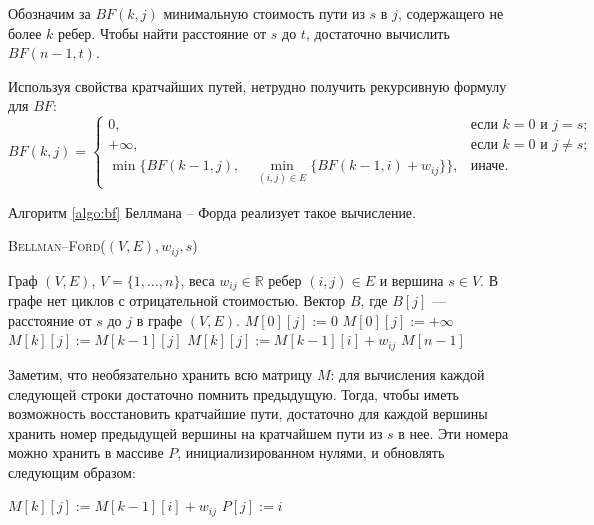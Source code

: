 \documentclass[a4paper,12pt]{article}
\newcommand{\algname}[1]{\textsc{#1}}
\begin{document}
Обозначим за $BF(k, j)$ минимальную стоимость пути из $s$ в $j$, содержащего не более $k$ ребер. Чтобы найти расстояние от $s$ до $t$, достаточно вычислить $BF(n-1, t)$.

Используя свойства кратчайших путей, нетрудно получить рекурсивную формулу для $BF$:
\[BF(k, j) =
	\begin{cases}
		0, & \text{если }k = 0\text{ и }j = s;\\
		+\infty, & \text{если }k = 0\text{ и }j \neq s;\\
		\min \big\{BF(k - 1, j),\quad\min_{(i, j) \in E}\{BF(k - 1, i) + w_{ij}\}\big\}, & \text{иначе}.
	\end{cases}
\]

Алгоритм \ref{algo:bf} Беллмана -- Форда реализует такое вычисление.

\begin{algorithm}
  	\caption{\algname{Bellman--Ford}($(V, E), w_{ij}, s$)}
	\label{algo:bf}
	\begin{algorithmic}%
		\Require Граф $(V, E)$, $V = \{1, \dots, n\}$, веса $w_{ij} \in \mathbb{R}$ ребер $(i, j) \in E$ и вершина $s \in V$. В графе нет циклов с отрицательной стоимостью.
		\Ensure Вектор $B$, где $B[j]$ --- расстояние от $s$ до $j$ в графе $(V, E)$.
		\State
				\State $M[0][j] := 0$
			\Else
				\State $M[0][j] := +\infty$
			\EndIf
		\EndFor
		\State
	    			\State $M[k][j] := M[k - 1][j]$
						\State $M[k][j] := M[k - 1][i] + w_{ij}$
					\EndIf
    				\EndFor
			\EndFor
		\EndFor
		\State
		\Return $M[n - 1]$
	\end{algorithmic}
\end{algorithm}

Заметим, что необязательно хранить всю матрицу $M$: для вычисления каждой следующей строки достаточно помнить предыдущую. Тогда, чтобы иметь возможность восстановить кратчайшие пути, достаточно для каждой вершины хранить номер предыдущей вершины на кратчайшем пути из $s$ в нее. Эти номера можно хранить в массиве $P$, инициализированном нулями, и обновлять следующим образом: 
\begin{center}
	\begin{algorithmic}
						\State $M[k][j] := M[k - 1][i] + w_{ij}$
						\State $P[j] := i$
					\EndIf
	\end{algorithmic}
\end{center}
\end{document}
